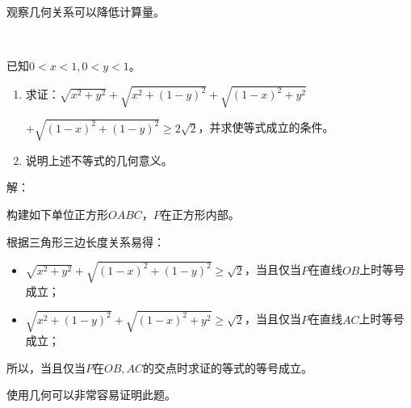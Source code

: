\begin{tcolorbox}
观察几何关系可以降低计算量。
\end{tcolorbox}

~

\begin{example}
已知$0<x<1,0<y<1$。
\begin{enumerate}
    \item 求证：$\sqrt{x^2+y^2}+\sqrt{x^2+\left( 1-y \right) ^2}+\sqrt{\left( 1-x \right) ^2+y^2}$
    
    $+\sqrt{\left( 1-x \right) ^2+\left( 1-y \right) ^2}\geqslant 2\sqrt{2}$，并求使等式成立的条件。
    \item 说明上述不等式的几何意义。
\end{enumerate}
\end{example}

解：

构建如下单位正方形$OABC$，$P$在正方形内部。

\begin{figure}[h]
\centering
{}
\end{figure}

根据三角形三边长度关系易得：
\begin{itemize}
    \item $\sqrt{x^2+y^2}+\sqrt{\left( 1-x \right) ^2+\left( 1-y \right) ^2}\geqslant \sqrt{2}$，当且仅当$P$在直线$OB$上时等号成立；
    \item $\sqrt{x^2+\left( 1-y \right) ^2}+\sqrt{\left( 1-x \right) ^2+y^2}\geqslant \sqrt{2}$，当且仅当$P$在直线$AC$上时等号成立；
\end{itemize}
所以，当且仅当$P$在$OB,AC$的交点时求证的等式的等号成立。

\begin{tcolorbox}
使用几何可以非常容易证明此题。
\end{tcolorbox}




